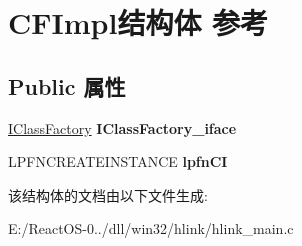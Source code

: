 \hypertarget{struct_c_f_impl}{}\section{C\+F\+Impl结构体 参考}
\label{struct_c_f_impl}
\subsection*{Public 属性}
\begin{DoxyCompactItemize}
\item 
\mbox{\label{struct_c_f_impl_a3848709e783fbc7de3c1710cc657518e}} 
\hyperlink{interface_i_class_factory}{I\+Class\+Factory} {\bfseries I\+Class\+Factory\+\_\+iface}
\item 
\mbox{\label{struct_c_f_impl_ac1fdd8fca64ca6d1e4085613752887e1}} 
L\+P\+F\+N\+C\+R\+E\+A\+T\+E\+I\+N\+S\+T\+A\+N\+CE {\bfseries lpfn\+CI}
\end{DoxyCompactItemize}


该结构体的文档由以下文件生成\+:\begin{DoxyCompactItemize}
\item 
E\+:/\+React\+O\+S-\/0../dll/win32/hlink/hlink\+\_\+main.\+c\end{DoxyCompactItemize}
